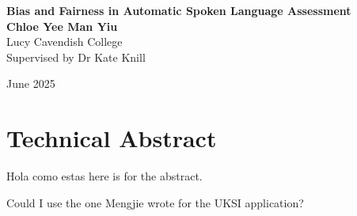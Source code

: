 \begin{center}
    \Large
    \textbf{Bias and Fairness in Automatic Spoken Language Assessment}
    \vspace{0.2in} \\

    \normalsize
    \textbf{Chloe Yee Man Yiu} \\
    Lucy Cavendish College \\
    Supervised by Dr Kate Knill
    \vspace{0.1in}

    June 2025
\end{center}

\section*{Technical Abstract}

Hola como estas here is for the abstract.

Could I use the one Mengjie wrote for the UKSI application?

\clearpage
